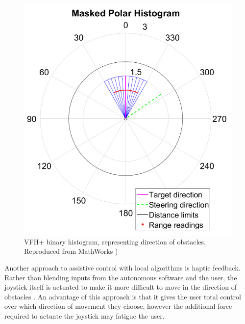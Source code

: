 \documentclass[12pt]{article}
\begin{document}
\begin{figure}[H]
    \centering
    \includegraphics[width=0.35\linewidth]{images/binary_histogram_vfh.png}
    \caption{VFH+ binary histogram, representing direction of obstacles. Reproduced from MathWorks \cite{mathworksVectorFieldHistogram2022})}
    \label{fig:binary_histogram_vfh}
\end{figure}

Another approach to assistive control with local algorithms is haptic feedback. Rather than
blending inputs from the autonomous software and the user, the joystick itself is actuated
to make it more difficult to move in the direction of obstacles \cite{kondoNavigationGuidanceControl2008}\cite{vanderpoortenPoweredWheelchairNavigation2012}.
An advantage of this approach is that it gives the user total control over which direction of movement they choose,
however the additional force required to actuate the joystick may fatigue the user.





\pagebreak
\end{document}
